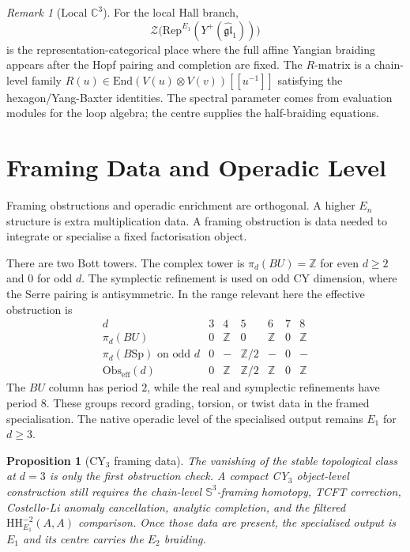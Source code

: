 \documentclass[11pt]{amsart}
\newtheorem{proposition}[theorem]{Proposition}
\theoremstyle{definition}
\theoremstyle{remark}
\newtheorem{remark}[theorem]{Remark}
\newcommand{\Rep}{\mathrm{Rep}}
\newcommand{\HH}{\mathrm{HH}}
\providecommand{\Obs}{\mathrm{Obs}}
\newcommand{\cZ}{\mathcal{Z}}
\newcommand{\C}{\mathbb{C}}
\newcommand{\Z}{\mathbb{Z}}
\newcommand{\fgl}{\mathfrak{gl}}
\begin{document}
\begin{remark}[Local \texorpdfstring{$\C^3$}{C3}]
For the local Hall branch,
\[
  \cZ\bigl(\Rep^{E_1}(Y^+(\widehat{\fgl}_1))\bigr)
\]
is the representation-categorical place where the full affine Yangian
braiding appears after the Hopf pairing and completion are fixed.  The
$R$-matrix is a chain-level family
$R(u)\in\mathrm{End}(V(u)\otimes V(v))[[u^{-1}]]$ satisfying the
hexagon/Yang-Baxter identities.  The spectral parameter comes from
evaluation modules for the loop algebra; the centre supplies the
half-braiding equations.
\end{remark}

\section{Framing Data and Operadic Level}
\label{sec:framing}

Framing obstructions and operadic enrichment are orthogonal.  A higher
$E_n$ structure is extra multiplication data.  A framing obstruction is
data needed to integrate or specialise a fixed factorisation object.

There are two Bott towers.  The complex tower is
$\pi_d(BU)=\Z$ for even $d\geq2$ and $0$ for odd $d$.  The symplectic
refinement is used on odd CY dimension, where the Serre pairing is
antisymmetric.  In the range relevant here the effective obstruction is
\[
\begin{array}{c|cccccc}
d & 3 & 4 & 5 & 6 & 7 & 8\\
\hline
\pi_d(BU) & 0 & \Z & 0 & \Z & 0 & \Z\\
\pi_d(B\mathrm{Sp})\text{ on odd }d & 0 & - & \Z/2 & - & 0 & -\\
\Obs_{\mathrm{eff}}(d) & 0 & \Z & \Z/2 & \Z & 0 & \Z
\end{array}
\]
The $BU$ column has period \(2\), while the real and symplectic
refinements have period \(8\).  These groups record grading, torsion, or
twist data in the framed specialisation.  The native operadic level of
the specialised output remains $E_1$ for $d\geq3$.

\begin{proposition}[CY$_3$ framing data]
\label{prop:cy3-framing-obligations}
The vanishing of the stable topological class at $d=3$ is only the
first obstruction check.  A compact CY$_3$ object-level construction
still requires the chain-level $\mathbb{S}^3$-framing homotopy, TCFT
correction, Costello-Li anomaly cancellation, analytic completion, and
the filtered $\HH^{-2}_{E_1}(A,A)$ comparison.  Once those data are
present, the specialised output is $E_1$ and its centre carries the
$E_2$ braiding.
\end{proposition}
\end{document}
